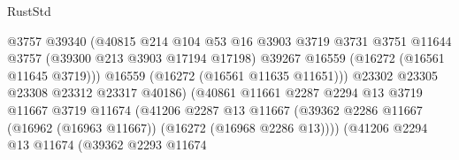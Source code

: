 \begin{lexlean}{RustStd}
\begin{coremodule}
                                            @3757
                                            @39340
                                            (@40815
                                              @214
                                              @104
                                              @53
                                              @16
                                              @3903
                                              @3719
                                              @3731
                                              @3751
                                              @11644
                                              @3757
                                              (@39300 @213 @3903 @17194 @17198)
                                              @39267
                                              @16559
                                              (@16272 (@16561 @11645 @3719)))
                                            @16559
                                            (@16272 (@16561 @11635 @11651)))
                                          @23302
                                          @23305
                                          @23308
                                          @23312
                                          @23317
                                          @40186)
                                        (@40861
                                          @11661
                                          @2287
                                          @2294
                                          @13
                                          @3719
                                          @11667
                                          @3719
                                          @11674
                                          (@41206
                                            @2287
                                            @13
                                            @11667
                                            (@39362
                                              @2286
                                              @11667
                                              (@16962 (@16963 @11667))
                                              (@16272 (@16968 @2286 @13))))
                                          (@41206
                                            @2294
                                            @13
                                            @11674
                                            (@39362
                                              @2293
                                              @11674

\end{coremodule}
\end{lexlean}
